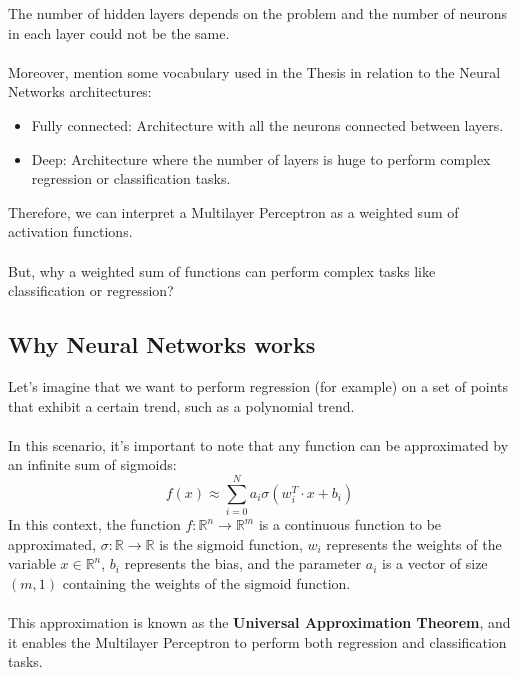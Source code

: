 \documentclass[a4paper, 11pt]{article}
\begin{document}
The number of hidden layers depends on the problem and the number of neurons in each layer could not be the same.\\
\textcolor{white}{a}\\
Moreover, mention some vocabulary used in the Thesis in relation to the Neural Networks architectures:
\begin{itemize}
    \item Fully connected: Architecture with all the neurons connected between layers.
    \item Deep: Architecture where the number of layers is huge to perform complex regression or classification tasks.
\end{itemize}
Therefore, we can interpret a Multilayer Perceptron as a weighted sum of activation functions.\\
\textcolor{white}{a}\\
But, why a weighted sum of functions can perform complex tasks like classification or regression?

\subsection{Why Neural Networks works}
Let's imagine that we want to perform regression (for example) on a set of points that exhibit a certain trend, such as a polynomial trend.\\
\textcolor{white}{a}\\
In this scenario, it's important to note that any function can be approximated by an infinite sum of sigmoids:
\begin{equation}
    f(x) \approx \sum_{i = 0}^N a_i\sigma(w^T_i\cdot x + b_i)
\end{equation}
In this context, the function $f:\mathbb{R}^n \rightarrow \mathbb{R}^m$ is a continuous function to be approximated, $\sigma:\mathbb{R} \rightarrow \mathbb{R}$ is the sigmoid function, $w_i$ represents the weights of the variable $x\in\mathbb{R}^n$, $b_i$ represents the bias, and the parameter $a_i$ is a vector of size $(m,1)$ containing the weights of the sigmoid function.\\
\textcolor{white}{a}\\
This approximation is known as the \textbf{Universal Approximation Theorem}, and it enables the Multilayer Perceptron to perform both regression and classification tasks.
\end{document}
